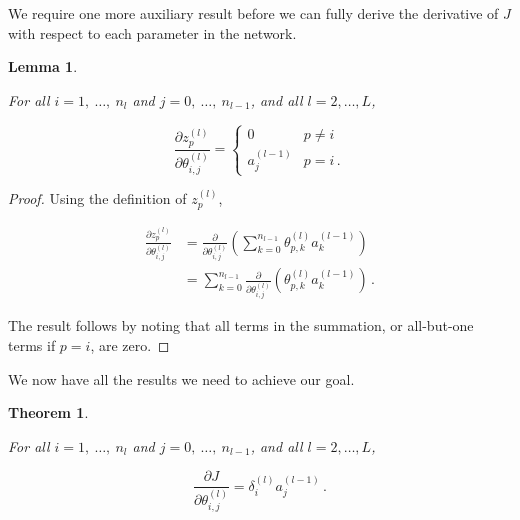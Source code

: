 \documentclass{article}[11pt]
\newtheorem{lemma}{Lemma}
\newtheorem{theorem}{Theorem}
\begin{document}
        We require one more auxiliary result before we can fully derive the derivative of $J$ with respect to each parameter in the network.
        
        
        \begin{lemma} \label{thm:dz_dtheta}
            
            For all $i = 1, \ \ldots, \ n_l$ and $j = 0, \ \ldots, \ n_{l-1}$, and all $l = 2, \ldots, L$,
            
            $$
            \frac{\partial z^{(l)}_p}{\partial \theta^{(l)}_{i,j}} = \begin{cases}
                0 & p \neq i \\
                a^{(l-1)}_j & p = i \,.
            \end{cases}
            $$
            
        \end{lemma}
        
        \begin{proof}
            
            Using the definition of $z^{(l)}_p$,
            
            $$ \begin{aligned}
            \frac{\partial z^{(l)}_p}{\partial \theta^{(l)}_{i,j}}
            &= \frac{\partial}{\partial \theta^{(l)}_{i,j}} \left( \sum_{k=0}^{n_{l-1}} \theta^{(l)}_{p,k} a^{(l-1)}_k \right) \\
            &= \sum_{k=0}^{n_{l-1}} \frac{\partial}{\partial \theta^{(l)}_{i,j}} \left( \theta^{(l)}_{p,k} a^{(l-1)}_k \right) \,.
            \end{aligned} $$
            
            The result follows by noting that all terms in the summation, or all-but-one terms if $p = i$, are zero.
            
        \end{proof}
        
        
        We now have all the results we need to achieve our goal.
        
        
        \begin{theorem} \label{thm:backprop}
            
            For all $i = 1, \ \ldots, \ n_l$ and $j = 0, \ \ldots, \ n_{l-1}$, and all $l = 2, \ldots, L$,
            
            $$
            \frac{\partial J}{\partial \theta^{(l)}_{i,j}} = \delta^{(l)}_i a^{(l-1)}_j \,.
            $$
            
        \end{theorem}
        
\end{document}
